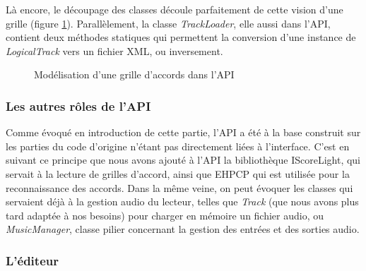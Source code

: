 \documentclass[a4paper,11pt]{article}
\begin{document}
Là encore, le découpage des classes découle parfaitement de cette vision d'une grille (figure \ref{diag_api_tracks}). Parallèlement, la classe \textit{TrackLoader}, elle aussi dans l'API, contient deux méthodes statiques qui permettent la conversion d'une instance de \textit{LogicalTrack} vers un fichier XML, ou inversement.

\begin{figure}[H]
\begin{center}
\caption{Modélisation d'une grille d'accords dans l'API}
\label{diag_api_tracks}
\end{center}
\end{figure}

\subsubsection*{Les autres rôles de l'API}

Comme évoqué en introduction de cette partie, l'API a été à la base construit sur les parties du code d'origine n'étant pas directement liées à l'interface. C'est en suivant ce principe que nous avons ajouté à l'API la bibliothèque IScoreLight, qui servait à la lecture de grilles d'accord, ainsi que EHPCP qui est utilisée pour la reconnaissance des accords. Dans la même veine, on peut évoquer les classes qui servaient déjà à la gestion audio du lecteur, telles que \textit{Track} (que nous avons plus tard adaptée à nos besoins) pour charger en mémoire un fichier audio, ou \textit{MusicManager}, classe pilier concernant la gestion des entrées et des sorties audio.

\subsubsection{L'éditeur}
\end{document}
